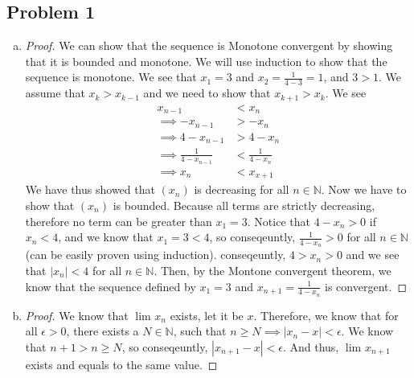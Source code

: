 \documentclass[12pt]{article}
\begin{document}
\subsection*{Problem 1}
\begin{enumerate}[a).]
    \item {
        \begin{proof}
        We can show that the sequence is Monotone convergent by showing that it is bounded and monotone.
        We will use induction to show that the sequence is monotone. 
        We see that $x_1 = 3$ and $x_2 = \frac{1}{4 - 3} = 1$, and $3 > 1$. 
        We assume that $x_k > x_{k-1}$ and we need to show that $x_{k+1} > x_{k}$. 
        We see 
        \begin{align*}
            x_{n-1} &< x_{n}\\
            \implies - x_{n-1} &> -x_{n}\\
            \implies4 - x_{n-1} &> 4 -x_{n}\\
            \implies \frac{1}{4 - x_{n-1}} &< \frac{1}{4 -x_{n}}\\
            \implies x_n &< x_{x+1}
        \end{align*}
        We have thus showed that $(x_n)$ is decreasing for all $n \in \mathbb{N}$. 
        Now we have to show that $(x_n)$ is bounded.
        Because all terms are strictly decreasing, therefore no term can be greater than $x_1 = 3$. 
        Notice that $4 - x_n > 0$ if $x_n < 4$, and we know that $x_1 = 3 < 4$, so conseqeuntly, $\frac{1}{4 - x_n} > 0$ for all $n \in \mathbb{N}$ (can be easily proven using induction). 
        conseqeuntly, $4 > x_n > 0$ and we see that $|x_n| < 4$ for all $n \in \mathbb{N}$. 
        Then, by the Montone convergent theorem, we know that the sequence defined by $x_1 = 3$ and $x_{n+1} = \frac{1}{4 - x_n}$ is convergent. 
        \end{proof}

    }
    \item {
        \begin{proof}
        We know that $\lim_{} x_n$ exists, let it be $x$. 
        Therefore, we know that for all $\epsilon > 0$, there exists a $N \in \mathbb{N}$, such that $ n \ge N \implies |x_n - x| < \epsilon$. 
        We know that $n+1 > n \ge N$, so conseqeuntly, $|x_{n+1} - x| < \epsilon$. 
        And thus, $\lim_{} x_{n+1}$ exists and equals to the same value.
        \end{proof}

}
\end{enumerate}
\end{document}
